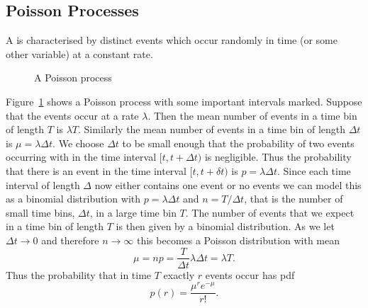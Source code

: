 \documentclass[a4paper]{article}
\begin{document}
    \subsection{Poisson Processes}
    A  is characterised by distinct events which occur randomly in time (or some other variable) at a constant rate.
    \begin{figure}[ht]
        \centering
        \caption{A Poisson process}
        \label{fig:poisson process}
    \end{figure}
    Figure~\ref{fig:poisson process} shows a Poisson process with some important intervals marked.
    Suppose that the events occur at a rate \(\lambda\).
    Then the mean number of events in a time bin of length \(T\) is \(\lambda T\).
    Similarly the mean number of events in a time bin of length \(\Delta t\) is \(\mu = \lambda\Delta t\).
    We choose \(\Delta t\) to be small enough that the probability of two events occurring with in the time interval \([t, t + \Delta t)\) is negligible.
    Thus the probability that there is an event in the time interval \([t, t + \delta t)\) is \(p = \lambda\Delta t\).
    Since each time interval of length \(\Delta\) now either contains one event or no events we can model this as a binomial distribution with \(p = \lambda\Delta t\) and \(n = T/\Delta t\), that is the number of small time bins, \(\Delta t\), in a large time bin \(T\).
    The number of events that we expect in a time bin of length \(T\) is then given by a binomial distribution.
    As we let \(\Delta t \to 0\) and therefore \(n \to \infty\) this becomes a Poisson distribution with mean 
    \[\mu = np = \frac{T}{\Delta t}\lambda\Delta t = \lambda T.\]
    Thus the probability that in time \(T\) exactly \(r\) events occur has \gls{pdf}
    \[p(r) = \frac{\mu^re^{-\mu}}{r!}.\]
    
\end{document}
